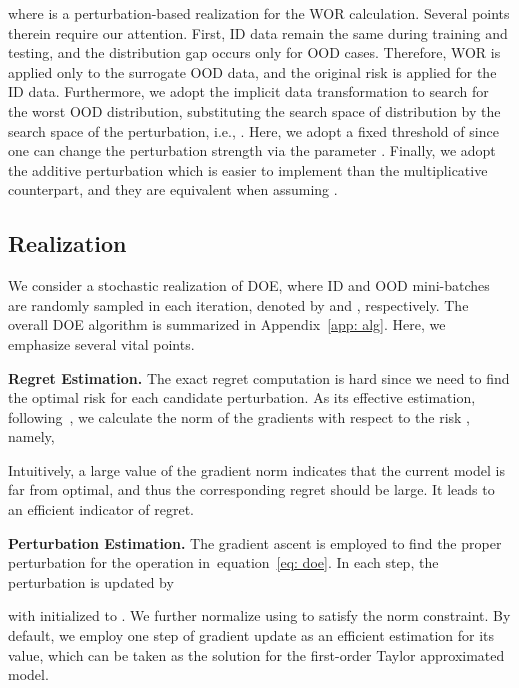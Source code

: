 \documentclass{article} \usepackage{iclr2022_conference,times}
\def\eqref#1{equation~\ref{#1}}
\begin{document}
where  is a perturbation-based realization for the WOR calculation. Several points therein require our attention. First, ID data remain the same during training and testing, and the distribution gap occurs only for OOD cases. Therefore, WOR is applied only to the surrogate OOD data, and the original risk  is applied for the ID data. Furthermore, we adopt the implicit data transformation to search for the worst OOD distribution, substituting the search space of distribution  by the search space of the perturbation, i.e., . Here, we adopt a fixed threshold of  since one can change the perturbation strength via the parameter . Finally, we adopt the additive perturbation  which is easier to implement than the multiplicative counterpart, and they are equivalent when assuming . 













\subsection{Realization} 

We consider a stochastic realization of DOE, where ID and OOD mini-batches are randomly sampled in each iteration, denoted by  and , respectively. The overall DOE algorithm is summarized in Appendix~\ref{app: alg}. Here, we emphasize several vital points.




\textbf{Regret Estimation.} The exact regret computation is hard since we need to find the optimal risk for each candidate perturbation. As its effective estimation, following~\citep{arjovsky2019invariant,AgarwalZ22}, we calculate the norm of the gradients with respect to the risk , namely,

{Intuitively, a large value of the gradient norm indicates that the current model is far from optimal, and thus the corresponding regret should be large. It leads to an efficient indicator of regret. }

\textbf{Perturbation Estimation.} The gradient ascent is employed to find the proper perturbation  for the  operation in~\eqref{eq: doe}. In each step, the perturbation is updated by

with  initialized to . We further normalize  using  to satisfy the norm constraint. By default, we employ one step of gradient update as an efficient estimation for its value, which can be taken as the solution for the first-order Taylor approximated model. 
\end{document}
